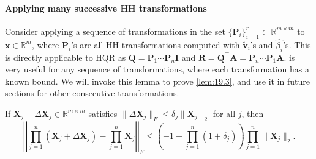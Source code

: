 \documentclass[review,onefignum,onetabnum]{siamart190516}
\newcommand{\R}{\mathbb{R}}
\newcommand{\dd}{\delta}
\newcommand{\bb}[1]{\mathbf{#1}}
\begin{document}
\paragraph{Applying many successive HH transformations}
Consider applying a sequence of transformations in the set $\{\bb{P}_{i}\}_{i=1}^r\subset\R^{m\times m}$ to $\bb{x}\in\R^m$, where $\bb{P}_{i}$'s are all HH transformations computed with $\tilde{\bb{v}}_i$'s and $\hat{\beta_i}$'s.
This is directly applicable to HQR as $\bb{Q}=\bb{P}_{1}\cdots\bb{P}_{n}\bb{I}$ and $\bb{R} = \bb{Q}^{\top}\bb{A} = \bb{P}_{n}\cdots\bb{P}_{1}\bb{A}$.
 is very useful for any sequence of transformations, where each transformation has a known bound.
We will invoke this lemma to prove \cref{lem:19.3}, and use it in future sections for other consecutive transformations.
\begin{lemma}\label{lem:3.7}
	If $\bb{X}_{j} + \Delta \bb{X}_{j} \in\R^{m\times m}$ satisfies $\|\Delta \bb{X}_{j}\|_F\leq \dd_j \|\bb{X}_{j}\|_2$ for all $j$, then $$\left|\left|\prod_{j=1}^n (\bb{X}_{j} + \Delta \bb{X}_{j})- \prod_{j=1}^n\bb{X}_{j} \right|\right|_F\leq\left(-1+\prod_{j=1}^n(1+\dd_j)\right)\prod_{j=1}^n\|\bb{X}_{j}\|_2.$$
\end{lemma}
\end{document}
